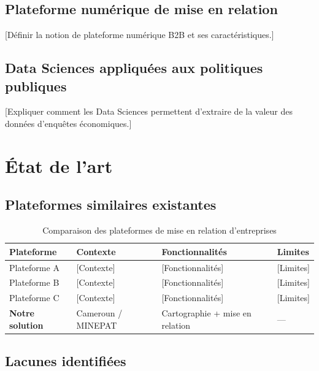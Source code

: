 \documentclass[12pt, a4paper, oneside]{report}
\begin{document}
\subsection{Plateforme numérique de mise en relation}

[Définir la notion de plateforme numérique B2B et ses caractéristiques.]

\subsection{Data Sciences appliquées aux politiques publiques}

[Expliquer comment les Data Sciences permettent d'extraire de la valeur des données d'enquêtes économiques.]

\section{État de l'art}
\label{sec:etat_art}

\subsection{Plateformes similaires existantes}

\begin{table}[H]
  \centering
  \caption{Comparaison des plateformes de mise en relation d'entreprises}
  \label{tab:comparaison}
  \renewcommand{\arraystretch}{1.3}
  \begin{tabularx}{\textwidth}{lXXX}
    \toprule
    \rowcolor{primary!20}
    \textbf{Plateforme} & \textbf{Contexte} & \textbf{Fonctionnalités} & \textbf{Limites} \\
    \midrule
    Plateforme A & [Contexte] & [Fonctionnalités] & [Limites] \\
    \rowcolor{lightgray}
    Plateforme B & [Contexte] & [Fonctionnalités] & [Limites] \\
    Plateforme C & [Contexte] & [Fonctionnalités] & [Limites] \\
    \rowcolor{lightgray}
    \textbf{Notre solution} & Cameroun / MINEPAT & Cartographie + mise en relation & — \\
    \bottomrule
  \end{tabularx}
\end{table}

\subsection{Lacunes identifiées}
\end{document}
